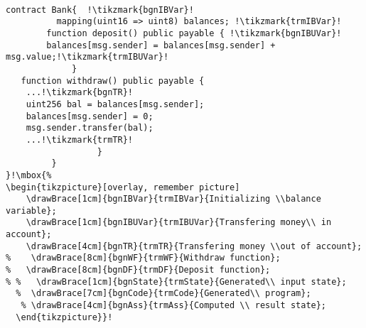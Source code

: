 \begin{lstlisting}[style=solidity_style, escapechar=!, basicstyle=\tiny, mathescape]

contract Bank{	!\tikzmark{bgnIBVar}!
    	  mapping(uint16 => uint8) balances; !\tikzmark{trmIBVar}!
        function deposit() public payable { !\tikzmark{bgnIBUVar}!
        balances[msg.sender] = balances[msg.sender] + msg.value;!\tikzmark{trmIBUVar}!
             }
   function withdraw() public payable { 
	...!\tikzmark{bgnTR}!      
	uint256 bal = balances[msg.sender];
	balances[msg.sender] = 0;
	msg.sender.transfer(bal);
	...!\tikzmark{trmTR}!
                  }
         }
}!\mbox{%
\begin{tikzpicture}[overlay, remember picture]
    \drawBrace[1cm]{bgnIBVar}{trmIBVar}{Initializing \\balance variable};
    \drawBrace[1cm]{bgnIBUVar}{trmIBUVar}{Transfering money\\ in account};
    \drawBrace[4cm]{bgnTR}{trmTR}{Transfering money \\out of account};
%    \drawBrace[8cm]{bgnWF}{trmWF}{Withdraw function};
%   \drawBrace[8cm]{bgnDF}{trmDF}{Deposit function};
% %   \drawBrace[1cm]{bgnState}{trmState}{Generated\\ input state};
  %  \drawBrace[7cm]{bgnCode}{trmCode}{Generated\\ program};
   % \drawBrace[4cm]{bgnAss}{trmAss}{Computed \\ result state};
  \end{tikzpicture}}!
\end{lstlisting}
  
